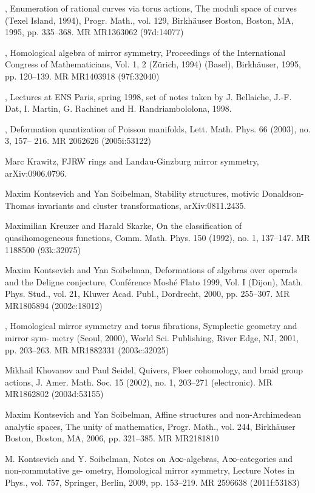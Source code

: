 {\begin{list}{}{%
  \setlength{\leftmargin}{3.4em}%
  \setlength{\itemindent}{-3.4em}%
  \setlength{\itemsep}{1.5pt}%
  \setlength{\parsep}{0pt}%
  \setlength{\listparindent}{0pt}%
}
\item[{[Kon95a]}] , Enumeration of rational curves via torus actions, The moduli space of curves (Texel Island, 1994), Progr. Math., vol. 129, Birkhäuser Boston, Boston, MA, 1995, pp. 335--368. MR MR1363062 (97d:14077)
\item[{[Kon95b]}] , Homological algebra of mirror symmetry, Proceedings of the International Congress of Mathematicians, Vol. 1, 2 (Zürich, 1994) (Basel), Birkhäuser, 1995, pp. 120--139. MR MR1403918 (97f:32040)
\item[{[Kon98]}] , Lectures at ENS Paris, spring 1998, set of notes taken by J. Bellaiche, J.-F. Dat, I. Martin, G. Rachinet and H. Randriambololona, 1998.
\item[{[Kon03]}] , Deformation quantization of Poisson manifolds, Lett. Math. Phys. 66 (2003), no. 3, 157-- 216. MR 2062626 (2005i:53122)
\item[{[Kra]}] Marc Krawitz, FJRW rings and Landau-Ginzburg mirror symmetry, arXiv:0906.0796.
\item[{[KS]}] Maxim Kontsevich and Yan Soibelman, Stability structures, motivic Donaldson-Thomas invariants and cluster transformations, arXiv:0811.2435.
\item[{[KS92]}] Maximilian Kreuzer and Harald Skarke, On the classification of quasihomogeneous functions, Comm. Math. Phys. 150 (1992), no. 1, 137--147. MR 1188500 (93k:32075)
\item[{[KS00]}] Maxim Kontsevich and Yan Soibelman, Deformations of algebras over operads and the Deligne conjecture, Conférence Moshé Flato 1999, Vol. I (Dijon), Math. Phys. Stud., vol. 21, Kluwer Acad. Publ., Dordrecht, 2000, pp. 255--307. MR MR1805894 (2002e:18012)
\item[{[KS01]}] , Homological mirror symmetry and torus fibrations, Symplectic geometry and mirror sym- metry (Seoul, 2000), World Sci. Publishing, River Edge, NJ, 2001, pp. 203--263. MR MR1882331 (2003c:32025)
\item[{[KS02]}] Mikhail Khovanov and Paul Seidel, Quivers, Floer cohomology, and braid group actions, J. Amer. Math. Soc. 15 (2002), no. 1, 203--271 (electronic). MR MR1862802 (2003d:53155)
\item[{[KS06]}] Maxim Kontsevich and Yan Soibelman, Affine structures and non-Archimedean analytic spaces, The unity of mathematics, Progr. Math., vol. 244, Birkhäuser Boston, Boston, MA, 2006, pp. 321--385. MR MR2181810
\item[{[KS09]}] M. Kontsevich and Y. Soibelman, Notes on A∞-algebras, A∞-categories and non-commutative ge- ometry, Homological mirror symmetry, Lecture Notes in Phys., vol. 757, Springer, Berlin, 2009, pp. 153--219. MR 2596638 (2011f:53183)

\end{list}}
